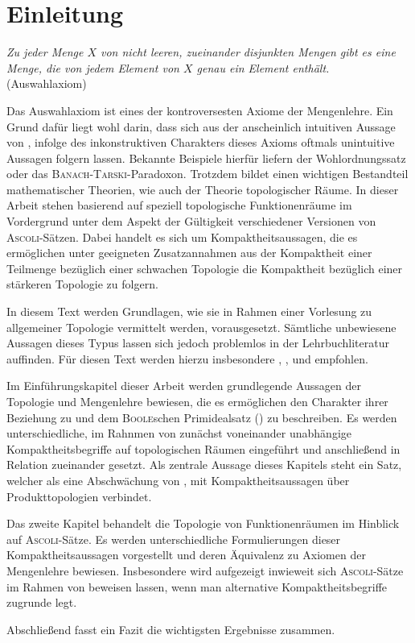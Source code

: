 \chapter*{Einleitung}

\begin{addmargin}[2em]{2em}%
  \textit{Zu jeder Menge $X$ von nicht leeren, zueinander disjunkten Mengen gibt es eine Menge, die von jedem Element von $X$ genau ein Element enthält.} 
  \flushright(Auswahlaxiom)
\end{addmargin}

Das Auswahlaxiom \AC ist eines der kontroversesten Axiome der Mengenlehre.
Ein Grund dafür liegt wohl darin, dass sich aus der anscheinlich intuitiven Aussage von \AC, infolge des inkonstruktiven Charakters dieses Axioms oftmals unintuitive Aussagen folgern lassen.
Bekannte Beispiele hierfür liefern der Wohlordnungssatz oder das \textsc{Banach}-\textsc{Tarski}-Paradoxon.
Trotzdem bildet \AC einen wichtigen Bestandteil mathematischer Theorien, wie auch der Theorie topologischer Räume.
In dieser Arbeit stehen basierend auf \cite{herrlich2006axiom} speziell topologische Funktionenräume im Vordergrund unter dem Aspekt der Gültigkeit verschiedener Versionen von \textsc{Ascoli}-Sätzen.
Dabei handelt es sich um Kompaktheitsaussagen, die es ermöglichen unter geeigneten Zusatzannahmen aus der Kompaktheit einer Teilmenge bezüglich einer schwachen Topologie die Kompaktheit bezüglich einer stärkeren Topologie zu folgern.

In diesem Text werden Grundlagen, wie sie in Rahmen einer Vorlesung zu allgemeiner Topologie vermittelt werden, vorausgesetzt.
Sämtliche unbewiesene Aussagen dieses Typus lassen sich jedoch problemlos in der Lehrbuchliteratur auffinden.
Für diesen Text werden hierzu insbesondere \cite{bartsch2015allgemeine}, \cite{ebbinghaus2003einfuhrung}, \cite{kelley1975general} und \cite{preuss1972topologische} empfohlen.

Im Einführungskapitel dieser Arbeit werden grundlegende Aussagen der Topologie und Mengenlehre bewiesen, die es ermöglichen den Charakter ihrer Beziehung zu \AC und dem \textsc{Boole}schen Primidealsatz (\PIT) zu beschreiben. 
Es werden unterschiedliche, im Rahnmen von \ZF zunächst voneinander unabhängige Kompaktheitsbegriffe auf topologischen Räumen eingeführt und anschließend in Relation zueinander gesetzt.
Als zentrale Aussage dieses Kapitels steht ein Satz, welcher \PIT als eine Abschwächung von \AC, mit Kompaktheitsaussagen über Produkttopologien verbindet.

Das zweite Kapitel behandelt die Topologie von Funktionenräumen im Hinblick auf \textsc{Ascoli}-Sätze.
Es werden unterschiedliche Formulierungen dieser Kompaktheitsaussagen vorgestellt und deren Äquivalenz zu Axiomen der Mengenlehre bewiesen.
Insbesondere wird aufgezeigt inwieweit sich \textsc{Ascoli}-Sätze im Rahmen von \ZF beweisen lassen, wenn man alternative Kompaktheitsbegriffe zugrunde legt.

Abschließend fasst ein Fazit die wichtigsten Ergebnisse zusammen. 
